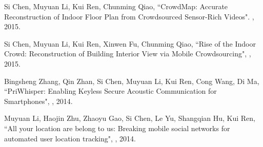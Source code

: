 \documentclass[11pt]{article}
\begin{document}
\renewcommand{\refname}{Selected Publications}
\begin{thebibliography}{99}
\newblock Si Chen, Muyuan Li, Kui Ren, Chunming Qiao,
\newblock ``CrowdMap: Accurate Reconstruction of Indoor Floor Plan from Crowdsourced Sensor-Rich Videos".
, 2015.


\newblock Si Chen, Muyuan Li, Kui Ren, Xinwen Fu, Chunming Qiao,
\newblock ``Rise of the Indoor Crowd: Reconstruction of Building Interior View via Mobile Crowdsourcing",
, 2015.


\newblock Bingsheng Zhang, Qin Zhan, Si Chen, Muyuan Li, Kui Ren, Cong Wang, Di Ma,
\newblock ``PriWhisper: Enabling Keyless Secure Acoustic Communication for Smartphones",
, 2014.


\newblock Muyuan Li, Haojin Zhu, Zhaoyu Gao, Si Chen, Le Yu, Shangqian Hu, Kui Ren,
\newblock ``All your location are belong to us: Breaking mobile social networks for automated user location tracking",
, 2014.



\end{thebibliography}
\end{document}

